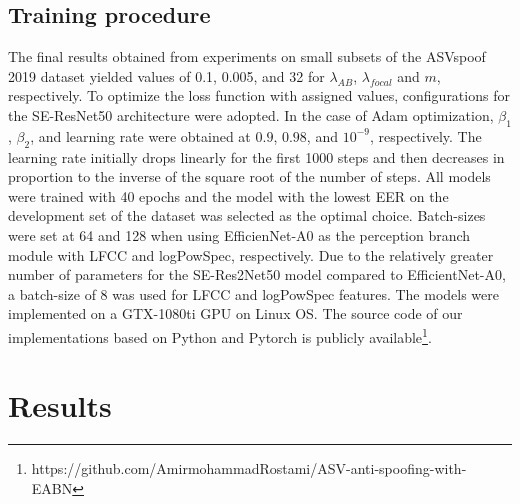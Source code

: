 \documentclass[a4paper]{article}
\begin{document}
\subsection{Training procedure}
The final results obtained from experiments on small subsets of the ASVspoof 2019 dataset yielded values of 0.1, 0.005, and 32 for $\lambda_{AB}$, $\lambda_{focal}$ and $m$, respectively. To optimize the loss function with assigned values, configurations for the SE-ResNet50 architecture were adopted. In the case of Adam optimization, $\beta_1$, $\beta_2$, and learning rate were obtained at $0.9$, $0.98$, and $10^{-9}$, respectively. The learning rate initially drops linearly for the first 1000 steps and then decreases in proportion to the inverse of the square root of the number of steps. All models were trained with 40 epochs and the model with the lowest EER on the development set of the dataset was selected as the optimal choice. Batch-sizes were set at 64 and 128 when using EfficienNet-A0 as the perception branch module with LFCC and logPowSpec, respectively. Due to the relatively greater number of parameters for the SE-Res2Net50 model compared to EfficientNet-A0, a batch-size of 8 was used for LFCC and logPowSpec features. The models were implemented on a GTX-1080ti GPU on Linux OS. The source code of our implementations based on Python and Pytorch is publicly available\footnote{https://github.com/AmirmohammadRostami/ASV-anti-spoofing-with-EABN}.
\section{Results}
\end{document}
